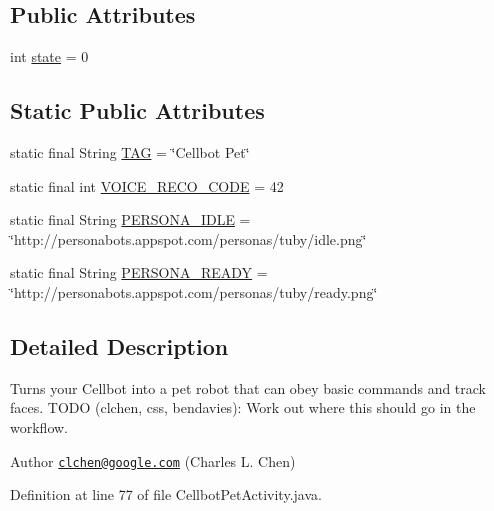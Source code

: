 \subsection*{Public Attributes}
\begin{DoxyCompactItemize}
\item 
int \hyperlink{classcom_1_1cellbots_1_1directcontrol_1_1_cellbot_pet_activity_a44cb62aa6ced32575ae892b6a4851680}{state} = 0
\end{DoxyCompactItemize}
\subsection*{Static Public Attributes}
\begin{DoxyCompactItemize}
\item 
static final String \hyperlink{classcom_1_1cellbots_1_1directcontrol_1_1_cellbot_pet_activity_a9a154d9f141a9bd2ca204303c22a9dd0}{T\-A\-G} = \char`\"{}Cellbot Pet\char`\"{}
\item 
static final int \hyperlink{classcom_1_1cellbots_1_1directcontrol_1_1_cellbot_pet_activity_a9e900de856474be2bc5431d0d3109222}{V\-O\-I\-C\-E\-\_\-\-R\-E\-C\-O\-\_\-\-C\-O\-D\-E} = 42
\item 
static final String \hyperlink{classcom_1_1cellbots_1_1directcontrol_1_1_cellbot_pet_activity_a6d0102e3c429683090353ca6ace13243}{P\-E\-R\-S\-O\-N\-A\-\_\-\-I\-D\-L\-E} = \char`\"{}http\-://personabots.\-appspot.\-com/personas/tuby/idle.\-png\char`\"{}
\item 
static final String \hyperlink{classcom_1_1cellbots_1_1directcontrol_1_1_cellbot_pet_activity_ad88d2d6b9599f7b288a677b958230e3e}{P\-E\-R\-S\-O\-N\-A\-\_\-\-R\-E\-A\-D\-Y} = \char`\"{}http\-://personabots.\-appspot.\-com/personas/tuby/ready.\-png\char`\"{}
\end{DoxyCompactItemize}


\subsection{Detailed Description}
Turns your Cellbot into a pet robot that can obey basic commands and track faces. T\-O\-D\-O (clchen, css, bendavies)\-: Work out where this should go in the workflow.

\begin{DoxyAuthor}{Author}
\href{mailto:clchen@google.com}{\tt clchen@google.\-com} (Charles L. Chen) 
\end{DoxyAuthor}


Definition at line 77 of file Cellbot\-Pet\-Activity.\-java.



